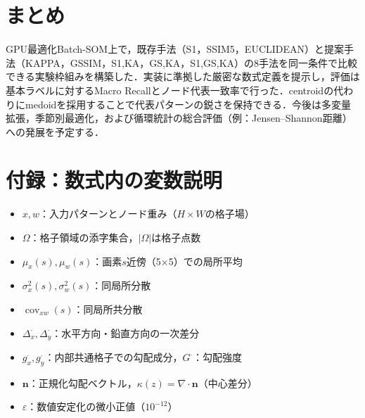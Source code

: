 \documentclass{jarticle}
\theoremstyle{definition}
\begin{document}
\section{まとめ}
GPU最適化Batch-SOM上で，既存手法（S1，SSIM5，EUCLIDEAN）と提案手法（KAPPA，GSSIM，S1,KA，GS,KA，S1,GS,KA）の8手法を同一条件で比較できる実験枠組みを構築した．実装に準拠した厳密な数式定義を提示し，評価は基本ラベルに対するMacro Recallとノード代表一致率で行った．centroidの代わりにmedoidを採用することで代表パターンの鋭さを保持できる．今後は多変量拡張，季節別最適化，および循環統計の総合評価（例：Jensen–Shannon距離）への発展を予定する．

\section*{付録：数式内の変数説明}
\begin{itemize}
\item $x,w$：入力パターンとノード重み（$H\times W$の格子場）
\item $\Omega$：格子領域の添字集合，$|\Omega|$は格子点数
\item $\mu_x(s),\mu_w(s)$：画素$s$近傍（5×5）での局所平均
\item $\sigma_x^2(s),\sigma_w^2(s)$：同局所分散
\item $\operatorname{cov}_{xw}(s)$：同局所共分散
\item $\Delta_x^\cdot,\Delta_y^\cdot$：水平方向・鉛直方向の一次差分
\item $g_x^\cdot,g_y^\cdot$：内部共通格子での勾配成分，$G^\cdot$：勾配強度
\item $\bm{n}$：正規化勾配ベクトル，$\kappa(z)=\nabla\cdot\bm{n}$（中心差分）
\item $\varepsilon$：数値安定化の微小正値（$10^{-12}$）
\end{itemize}



\end{document}
